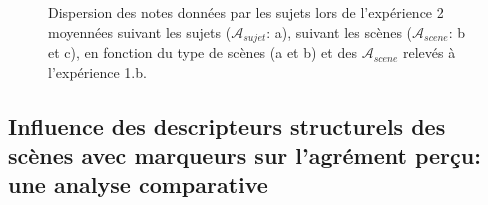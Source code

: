 \begin{figure}[t]
        \myfloatalign
       \caption{Dispersion des notes données par les sujets lors de l'expérience 2 moyennées suivant les sujets ($\mathcal{A}_{sujet}$: a), suivant les scènes ($\mathcal{A}_{scene}$: b et c), en fonction du type de scènes (a et b) et des $\mathcal{A}_{scene}$ relevés à l'expérience 1.b.}\label{fig:xp4_note_245}
\end{figure}

\subsection{Influence des descripteurs structurels des scènes avec marqueurs sur l'agrément perçu: une analyse comparative}

